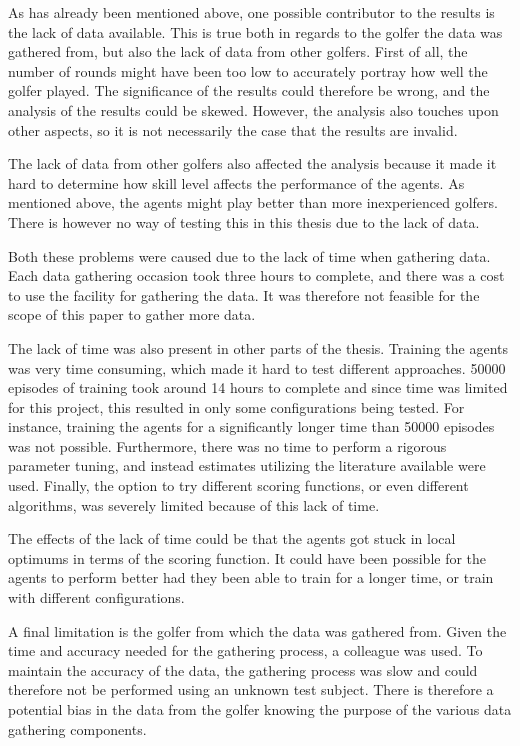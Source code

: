 \documentclass{kththesis}
\begin{document}
As has already been mentioned above, one possible contributor to the results is the lack of data available. This is true both in regards to the golfer the data was gathered from, but also the lack of data from other golfers. First of all, the number of rounds might have been too low to accurately portray how well the golfer played. The significance of the results could therefore be wrong, and the analysis of the results could be skewed. However, the analysis also touches upon other aspects, so it is not necessarily the case that the results are invalid.

The lack of data from other golfers also affected the analysis because it made it hard to determine how skill level affects the performance of the agents. As mentioned above, the agents might play better than more inexperienced golfers. There is however no way of testing this in this thesis due to the lack of data. 

Both these problems were caused due to the lack of time when gathering data. Each data gathering occasion took three hours to complete, and there was a cost to use the facility for gathering the data. It was therefore not feasible for the scope of this paper to gather more data.

The lack of time was also present in other parts of the thesis. Training the agents was very time consuming, which made it hard to test different approaches. 50000 episodes of training took around 14 hours to complete and since time was limited for this project, this resulted in only some configurations being tested. For instance, training the agents for a significantly longer time than 50000 episodes was not possible. Furthermore, there was no time to perform a rigorous parameter tuning, and instead estimates utilizing the literature available were used. Finally, the option to try different scoring functions, or even different algorithms, was severely limited because of this lack of time.

The effects of the lack of time could be that the agents got stuck in local optimums in terms of the scoring function. It could have been possible for the agents to perform better had they been able to train for a longer time, or train with different configurations. 

A final limitation is the golfer from which the data was gathered from. Given the time and accuracy needed for the gathering process, a colleague was used. To maintain the accuracy of the data, the gathering process was slow and could therefore not be performed using an unknown test subject. There is therefore a potential bias in the data from the golfer knowing the purpose of the various data gathering components. 
\end{document}
